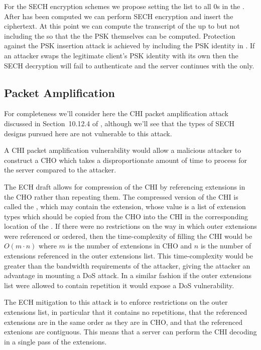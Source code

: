 For the \ac{SECH} encryption schemes we propose
setting the  list to all 0s in the .
After  has been computed we can perform \ac{SECH}
encryption and insert the ciphertext. At this point we can compute
the transcript of the  up to but not including
the  so that the
the \ac{PSK}  themselves can be computed.
Protection against the \ac{PSK} insertion attack is achieved by including the \ac{PSK}
identity in . If an attacker swaps the legitimate client's \ac{PSK} identity with its
own then the \ac{SECH} decryption will fail to authenticate and the server continues with the  only.

\subsection{ Packet Amplification}

For completeness we'll consider here the \ac{CHI}
packet amplification attack discussed in Section~10.12.4 of \cite{esni}, although we'll see that the
types of \ac{SECH} designs pursued here are not vulnerable to this attack.

A \ac{CHI} packet amplification
vulnerability would allow a malicious attacker to construct
a \ac{CHO} which takes a disproportionate amount
of time to process for the server compared to the attacker.

The \ac{ECH} draft allows for compression of the
\ac{CHI} by referencing extensions in the
\ac{CHO} rather than repeating them.
The compressed version of the \ac{CHI} is
called the , which may
contain the \varechouterextensions{} extension,
whose value is a list of extension types which should be copied
from the \ac{CHO} into the \ac{CHI}
in the corresponding location of the \varechouterextensions{}.
If there were no restrictions on the way in which outer extensions
were referenced or ordered, then the time-complexity of filling
the \ac{CHI} would be $O(m\cdot n)$ where $m$ is the number of extensions in \ac{CHO} and $n$ is the
number of extensions referenced in the outer extensions list.
This time-complexity would be greater than the bandwidth requirements of the attacker, giving the attacker an advantage in
mounting a \ac{DoS} attack.
In a similar fashion if the outer extensions list were allowed to contain repetition it would expose a \ac{DoS} vulnerability.

The \ac{ECH} mitigation to this attack is to enforce restrictions
on the outer extensions list, in particular that it contains no repetitions,
that the referenced extensions are in the same order as they are in \ac{CHO},
and that the referenced extenions are contiguous. This means that a server can perform the \ac{CHI} decoding in a single pass of the extensions.


